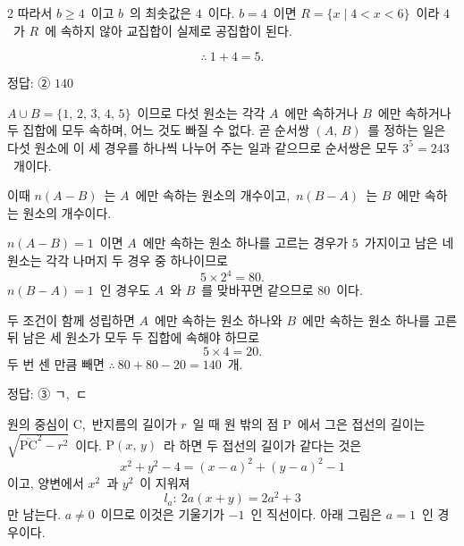 \documentclass[10pt,fleqn]{article}
\begin{document}
\begin{multicols*}{2}
따라서 $b\ge 4$\ 이고 $b$\ 의 최솟값은 $4$\ 이다. $b=4$\ 이면 $R=\{x\mid 4<x<6\}$\ 이라 $4$\ 가 $R$\ 에 속하지 않아 교집합이 실제로 공집합이 된다.

$$\therefore\ 1+4=5.$$

\begin{dmanswerbox}
정답: ② $140$
\end{dmanswerbox}

$A\cup B=\{1,\,2,\,3,\,4,\,5\}$\ 이므로 다섯 원소는 각각 $A$\ 에만 속하거나 $B$\ 에만 속하거나 두 집합에 모두 속하며, 어느 것도 빠질 수 없다. 곧 순서쌍 $(A,\,B)$\ 를 정하는 일은 다섯 원소에 이 세 경우를 하나씩 나누어 주는 일과 같으므로 순서쌍은 모두 $3^{5}=243$\ 개이다.

이때 $n(A-B)$\ 는 $A$\ 에만 속하는 원소의 개수이고,\ $n(B-A)$\ 는 $B$\ 에만 속하는 원소의 개수이다.

$n(A-B)=1$\ 이면 $A$\ 에만 속하는 원소 하나를 고르는 경우가 $5$\ 가지이고 남은 네 원소는 각각 나머지 두 경우 중 하나이므로
$$5\times 2^{4}=80.$$
$n(B-A)=1$\ 인 경우도 $A$\ 와 $B$\ 를 맞바꾸면 같으므로 $80$\ 이다.

두 조건이 함께 성립하면 $A$\ 에만 속하는 원소 하나와 $B$\ 에만 속하는 원소 하나를 고른 뒤 남은 세 원소가 모두 두 집합에 속해야 하므로
$$5\times 4=20.$$
두 번 센 만큼 빼면 $\therefore\ 80+80-20=140$\ 개.

\begin{dmanswerbox}
정답: ③ ㄱ,\ ㄷ
\end{dmanswerbox}

원의 중심이 $\mathrm{C}$,\ 반지름의 길이가 $r$\ 일 때 원 밖의 점 $\mathrm{P}$\ 에서 그은 접선의 길이는 $\sqrt{\overline{\mathrm{PC}}^{2}-r^{2}}$\ 이다. $\mathrm{P}(x,\,y)$\ 라 하면 두 접선의 길이가 같다는 것은
$$x^{2}+y^{2}-4=(x-a)^{2}+(y-a)^{2}-1$$
이고, 양변에서 $x^{2}$\ 과 $y^{2}$\ 이 지워져
$$l_{a}:\ 2a(x+y)=2a^{2}+3$$
만 남는다. $a\ne 0$\ 이므로 이것은 기울기가 $-1$\ 인 직선이다. 아래 그림은 $a=1$\ 인 경우이다.


\end{multicols*}
\end{document}
